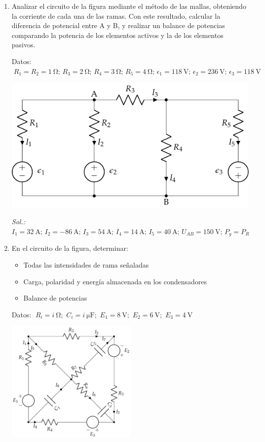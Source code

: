 \begin{enumerate}
\item Analizar el circuito de la figura mediante el método de las mallas, obteniendo la corriente de cada una de las ramas. Con este resultado, calcular la diferencia de potencial entre A y B, y realizar un balance de potencias comparando la potencia de los elementos activos y la de los elementos pasivos. 

Datos: $\; R_1 = R_2 = \qty{1}{\ohm};\, R_3 = \qty{2}{\ohm};\, R_4 = \qty{3}{\ohm};\, R_5=\qty{4}{\ohm};\, \epsilon_1=\qty{118}{\volt};\, \epsilon_2 = \qty{236}{\volt};\, \epsilon_3 = \qty{118}{\volt}$\\

  \begin{center}
    \includegraphics{../figs/mallas2.pdf}
  \end{center}

 \emph{Sol.:\;
    $I_1 = \qty{32}{\ampere};\, I_2 = \qty{-86}{\ampere};\, I_3 =\qty{54}{\ampere};\, I_4 = \qty{14}{\ampere};\, I_5 = \qty{40}{\ampere};\,
    U_{AB}=\qty{150}{\volt};\, P_g = P_R$}
 	
\item En el circuito de la figura, determinar:
  \begin{itemize}
  \item Todas las intensidades de rama señaladas
  \item Carga, polaridad y energía almacenada en los condensadores
  \item Balance de potencias
  \end{itemize}
    Datos: $\; R_i = \qty[parse-numbers=false]{i}{\ohm}$;\, $C_i = \qty[parse-numbers=false]{i}{\micro\farad}$;\, $E_1 = \qty{8}{\volt}$;\, $E_2 = \qty{6}{\volt}$;\, $E_3 = \qty{4}{\volt}$

  \begin{center}
    \includegraphics[height=6cm]{../figs/ej9_BT1.pdf}
  \end{center}


\end{enumerate}
